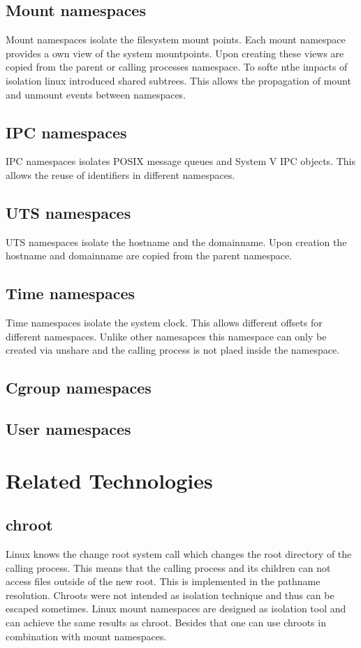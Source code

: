 \documentclass[10pt,twocolumn,a4paper]{article}
\begin{document}
\subsection{Mount namespaces}
Mount namespaces isolate the filesystem mount points. 
Each mount namespace provides a own view of the system mountpoints. 
Upon creating these views are copied from the parent or calling processes namespace.
To softe nthe impacts of isolation linux introduced shared subtrees. This allows the propagation of
mount and unmount events between namespaces.\cite{12}

\subsection{IPC namespaces}
IPC namespaces isolates POSIX message queues and System V IPC objects. This allows the reuse of identifiers
in different namespaces.\cite{13}

\subsection{UTS namespaces}
UTS namespaces isolate the hostname and the domainname. Upon creation the hostname and domainname are copied from the parent namespace.\cite{14}

\subsection{Time namespaces}
Time namespaces isolate the system clock. This allows different offsets for different namespaces.
Unlike other namesapces this namespace can only be created via unshare and  the calling process is
not plaed inside the namespace.\cite{15}

\subsection{Cgroup namespaces}


\subsection{User namespaces}

\section{Related Technologies}\label{sec:related}
\subsection{chroot}
Linux knows the change root system call which changes the root directory of the calling
process. This means that the calling process and its children can not access files outside of the
new root. This is implemented in the pathname resolution\cite{1}. Chroots were not intended as
isolation technique and thus can be escaped sometimes. Linux mount namespaces are
designed as isolation tool and can achieve the same results as chroot. Besides that one can use
chroots in combination with mount namespaces. %
\end{document}
